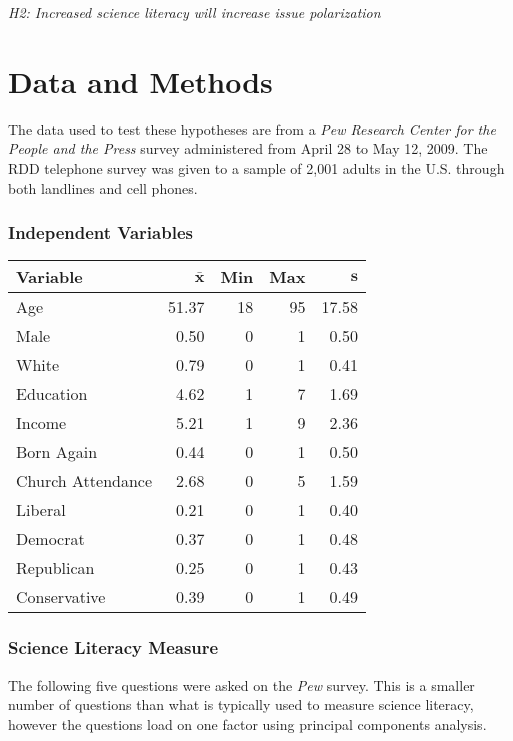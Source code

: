 \documentclass[a0,final]{a0poster}
\begin{document}
\begin{multicols}{3}
\begin{center}
  \textit{H2: Increased science literacy will increase issue polarization}
\end{center}

\section*{Data and Methods}

The data used to test these hypotheses are from a \textit{Pew Research Center for the People and the Press} survey administered from April 28 to May 12, 2009. The RDD telephone survey was given to a sample of 2,001 adults in the U.S. through both landlines and cell phones.   

\subsubsection*{Independent Variables}

\begin{center}
{
\tiny
\begin{tabular}{lrrrr}
 \textbf{Variable} & $\mathbf{\bar{x}}$ & \textbf{Min} & \textbf{Max} & $\mathbf{s}$ \\ 
  \hline
Age & 51.37 & 18 & 95 & 17.58 \\ 
  Male &  0.50 &  0 &  1 &  0.50 \\ 
  White &  0.79 &  0 &  1 &  0.41 \\ 
  Education &  4.62 &  1 &  7 &  1.69 \\ 
  Income &  5.21 &  1 &  9 &  2.36 \\ 
  Born Again &  0.44 &  0 &  1 &  0.50 \\ 
  Church Attendance &  2.68 &  0 &  5 &  1.59 \\ 
  Liberal &  0.21 &  0 &  1 &  0.40 \\ 
  Democrat &  0.37 &  0 &  1 &  0.48 \\ 
  Republican &  0.25 &  0 &  1 &  0.43 \\ 
  Conservative &  0.39 &  0 &  1 &  0.49 \\
\hline 
  \end{tabular}
}
\end{center}

\subsubsection*{Science Literacy Measure}

The following five questions were asked on the \textit{Pew} survey. This is a smaller number of questions than what is typically used to measure science literacy, however the questions load on one factor using principal components analysis. 


\end{multicols}
\end{document}
